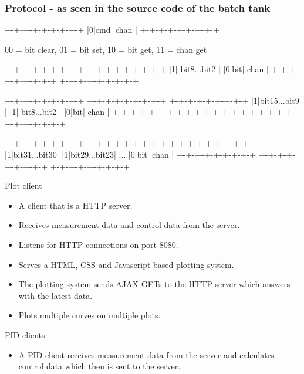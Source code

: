 \documentclass{beamer}
\begin{document}
\begin{frame}[fragile]
    \frametitle{Protocol - as seen in the source code of the batch tank}
        \small
\begin{semiverbatim}
+-+-+-+-+-+-+-+-+
|0|cmd|  chan   | 
+-+-+-+-+-+-+-+-+

00 = bit clear, 01 = bit set, 10 = bit get, 11 = chan get

+-+-+-+-+-+-+-+-+  +-+-+-+-+-+-+-+-+ 
|1| bit8...bit2 |  |0|bit|  chan   |
+-+-+-+-+-+-+-+-+  +-+-+-+-+-+-+-+-+ 

+-+-+-+-+-+-+-+-+  +-+-+-+-+-+-+-+-+  +-+-+-+-+-+-+-+-+ 
|1|bit15...bit9 |  |1| bit8...bit2 |  |0|bit|  chan   |
+-+-+-+-+-+-+-+-+  +-+-+-+-+-+-+-+-+  +-+-+-+-+-+-+-+-+ 
 
+-+-+-+-+-+-+-+-+  +-+-+-+-+-+-+-+-+     +-+-+-+-+-+-+-+-+ 
|1|bit31...bit30|  |1|bit29...bit23| ... |0|bit|  chan   |
+-+-+-+-+-+-+-+-+  +-+-+-+-+-+-+-+-+     +-+-+-+-+-+-+-+-+ 
\end{semiverbatim}
\end{frame}

\begin{frame}{Plot client}
	\begin{itemize}
    		\item A client that is a HTTP server.
        \item Receives measurement data and control data from the server.
        \item Listens for HTTP connections on port 8080.
        \item Serves a HTML, CSS and Javascript based plotting system.
        \item The plotting system sends AJAX GETs to the HTTP server which answers with the latest data.
        \item Plots multiple curves on multiple plots.
    \end{itemize}
\end{frame}

\begin{frame}{PID clients}
	\begin{itemize}
		\item A PID client receives measurement data from the server and calculates control data which then is sent to the server.            
	\end{itemize}
\end{frame}
\end{document}
